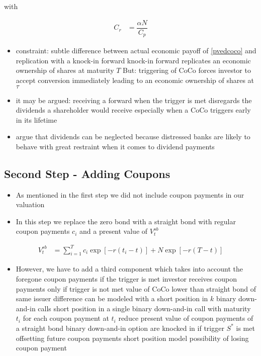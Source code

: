 with 

\begin{align}
C_r &= \dfrac{\alpha N}{C_p}
\end{align}

\begin{itemize}
\item constraint: subtle difference between actual economic payoff of \ref{pvedcoco} and replication with a knock-in forward
	\subitem knock-in forward replicates an economic ownership of shares at maturity $T$
	\subitem But: triggering of CoCo forces investor to accept conversion immediately leading to an economic ownership of shares at $\tau$
\item it may be argued: receiving a forward when the trigger is met disregards the dividends a shareholder would receive especially when a CoCo triggers early in its lifetime
\item \citet{de2011pricing} argue that dividends can be neglected because distressed banks are likely to behave with great restraint when it comes to dividend payments 
\end{itemize}

\subsection{Second Step - Adding Coupons}
\begin{itemize}
\item As mentioned in the first step we did not include coupon payments in our valuation
\item In this step we replace the zero bond with a straight bond with regular coupon payments $c_i$ and a present value of $V^{sb}_t$
\end{itemize}

\begin{align}
V^{sb}_t &= \sum^T_{i=1} c_i \exp\left[-r (t_i - t)\right] + N \exp\left[-r (T-t) \right]
\end{align}

\begin{itemize}
\item However, we have to add a third component which takes into account the foregone coupon payments if the trigger is met
	\subitem investor receives coupon payments only if trigger is not met
	\subitem value of CoCo lower than straight bond of same issuer
	\subitem difference can be modeled with a short position in $k$ binary down-and-in calls
	\subitem short position in a single binary down-and-in call with maturity $t_i$ for each coupon payment at $t_i$
	\subitem reduce present value of coupon payments of a straight bond
	\subitem binary down-and-in option are knocked in if trigger $S^*$ is met offsetting future coupon payments
	\subitem short position model possibility of losing coupon payment
\end{itemize}

